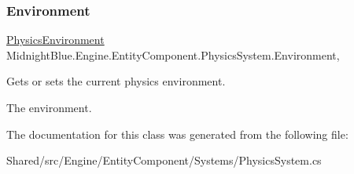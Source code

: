 \subsubsection{\texorpdfstring{Environment}{Environment}}
{\footnotesize\ttfamily \hyperlink{class_midnight_blue_1_1_engine_1_1_entity_component_1_1_physics_environment}{Physics\+Environment} Midnight\+Blue.\+Engine.\+Entity\+Component.\+Physics\+System.\+Environment\hspace{0.3cm}{\ttfamily [get]}, {\ttfamily [set]}}



Gets or sets the current physics environment. 

The environment.

The documentation for this class was generated from the following file\+:\begin{DoxyCompactItemize}
\item 
Shared/src/\+Engine/\+Entity\+Component/\+Systems/Physics\+System.\+cs\end{DoxyCompactItemize}
